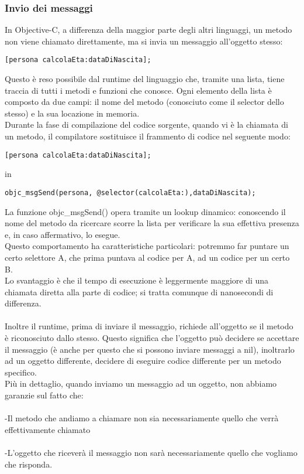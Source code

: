 \subsubsection{Invio dei messaggi}
In Objective-C, a differenza della maggior parte degli altri linguaggi, un metodo non viene chiamato direttamente, ma si invia un messaggio all'oggetto stesso: 
\lstset{language=[Objective]C, breakindent=40pt, breaklines}
\begin{lstlisting}
[persona calcolaEta:dataDiNascita];
\end{lstlisting}
Questo è reso possibile dal runtime del linguaggio che, tramite una lista, tiene traccia di tutti i metodi e funzioni che conosce. Ogni elemento della lista è composto da due campi: il nome del metodo (conosciuto come il selector dello stesso) e la sua locazione in memoria.
\\Durante la fase di compilazione del codice sorgente, quando vi è la chiamata di un metodo, il compilatore sostituisce il frammento di codice nel seguente modo:
\lstset{language=[Objective]C, breakindent=40pt, breaklines}
\begin{lstlisting}
[persona calcolaEta:dataDiNascita];
\end{lstlisting}
in \lstset{language=[Objective]C, breakindent=40pt, breaklines}
\begin{lstlisting}
objc_msgSend(persona, @selector(calcolaEta:),dataDiNascita);
\end{lstlisting}
\bigskip
\bigskip
La funzione objc\_msgSend() opera tramite un lookup dinamico: conoscendo il nome del metodo da ricercare scorre la lista per verificare la sua effettiva presenza e, in caso affermativo, lo esegue.\\ 
Questo comportamento ha caratteristiche particolari: potremmo far puntare un certo selettore A, che prima puntava al codice per A, ad un codice per un certo B.\\ 
Lo svantaggio è che il tempo di esecuzione è leggermente maggiore di una chiamata diretta alla parte di codice; si tratta comunque di nanosecondi di differenza.\\
\\Inoltre il runtime, prima di inviare il messaggio, richiede all’oggetto se il metodo è riconosciuto dallo stesso. Questo significa che l’oggetto può decidere se accettare il messaggio (è anche per questo che si possono inviare messaggi a nil), inoltrarlo ad un oggetto differente, decidere di eseguire codice differente per un metodo specifico.\\Più in dettaglio, quando inviamo un messaggio ad un oggetto, non abbiamo garanzie sul fatto che:\\ \\-Il metodo che andiamo a chiamare non sia necessariamente quello che verrà effettivamente chiamato\\\\-L’oggetto che riceverà il messaggio non sarà necessariamente quello che vogliamo che risponda.
